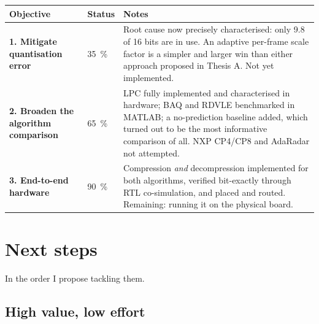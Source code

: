 \documentclass[11pt,a4paper]{article}
\begin{document}
\begin{center}
\small
\begin{tabular}{@{}p{45mm}p{12mm}p{75mm}@{}}
\toprule
Objective & Status & Notes\\
\midrule
\textbf{1. Mitigate quantisation error} & \SI{35}{\percent} &
Root cause now precisely characterised: only \num{9.8} of \num{16} bits are in
use. An adaptive per-frame scale factor is a simpler and larger win than either
approach proposed in Thesis A. Not yet implemented.\\
\addlinespace
\textbf{2. Broaden the algorithm comparison} & \SI{65}{\percent} &
LPC fully implemented and characterised in hardware; BAQ and RDVLE benchmarked
in MATLAB; a no-prediction baseline added, which turned out to be the most
informative comparison of all. NXP CP4/CP8 and AdaRadar not attempted.\\
\addlinespace
\textbf{3. End-to-end hardware} & \SI{90}{\percent} &
Compression \emph{and} decompression implemented for both algorithms,
verified bit-exactly through RTL co-simulation, and placed and routed.
Remaining: running it on the physical board.\\
\bottomrule
\end{tabular}
\end{center}

\section{Next steps}
\label{sec:next}

In the order I propose tackling them.

\subsection{High value, low effort}
\end{document}
